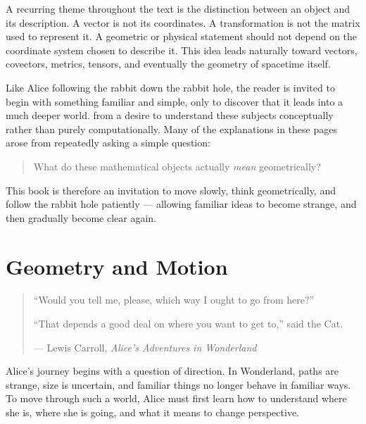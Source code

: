 \documentclass[11pt,openany]{book}
\theoremstyle{definition}
\begin{document}
\medskip

A recurring theme throughout the text is the distinction between an object and its 
description. A vector is not its coordinates. A transformation is not the matrix used 
to represent it. A geometric or physical statement should not depend on the coordinate 
system chosen to describe it. This idea leads naturally toward vectors, covectors, 
metrics, tensors, and eventually the geometry of spacetime itself.

\medskip

Like Alice following the rabbit down the rabbit hole, the reader is invited to begin with something familiar and simple, only to discover that it leads into a much deeper world.
from a desire to understand these subjects conceptually rather than purely computationally. 
Many of the explanations in these pages arose from repeatedly asking a simple question:

\begin{quote}
What do these mathematical objects actually \textit{mean} geometrically?
\end{quote}

\medskip



This book is therefore an invitation to move slowly, think geometrically, and follow the 
rabbit hole patiently --- allowing familiar ideas to become strange, and then gradually 
become clear again.
\tableofcontents

\mainmatter

\part{Geometry and Motion}



\vspace*{0.35\textheight}

\begin{quote}
\centering
``Would you tell me, please, which way I ought to go from here?''

\medskip

``That depends a good deal on where you want to get to,'' said the Cat.

\medskip

--- Lewis Carroll, \textit{Alice's Adventures in Wonderland}
\end{quote}


Alice's journey begins with a question of direction. In Wonderland, paths are strange, 
size is uncertain, and familiar things no longer behave in familiar ways. To move through 
such a world, Alice must first learn how to understand where she is, where she is going, 
and what it means to change perspective.
\end{document}
